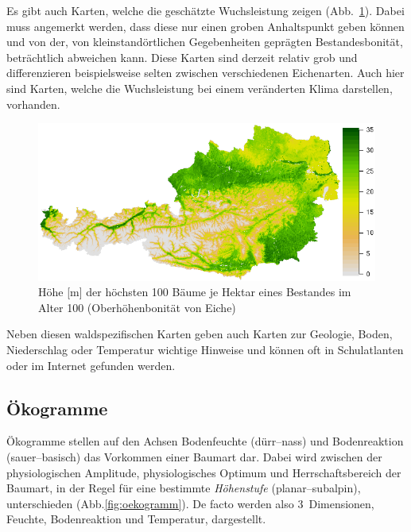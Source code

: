 \documentclass[twocolumn]{scrartcl}
\begin{document}
Es gibt auch Karten, welche die geschätzte Wuchsleistung zeigen
(Abb.~\ref{fig:Eichenbonitaet}). Dabei muss angemerkt werden, dass diese nur
einen groben Anhaltspunkt geben können und von der, von kleinstandörtlichen
Gegebenheiten geprägten Bestandesbonität, beträchtlich abweichen kann. Diese
Karten sind derzeit relativ grob und differenzieren beispielsweise selten
zwischen verschiedenen Eichenarten. Auch hier sind Karten, welche die
Wuchsleistung bei einem veränderten Klima darstellen, vorhanden.

\begin{figure}[htbp]
  \centering
  \includegraphics[width=.95\columnwidth]{./pic/quSp_t0_p1.png}
  \caption{Höhe [m] der höchsten 100 Bäume je Hektar eines Bestandes im
    Alter 100 (Oberhöhenbonität von Eiche)
    \citep[S.~17]{kindermann2021Eiche}}
  \label{fig:Eichenbonitaet}
\end{figure}

Neben diesen waldspezifischen Karten geben auch Karten zur Geologie,
Boden, Niederschlag oder Temperatur wichtige Hinweise und können oft
in Schulatlanten oder im Internet gefunden werden.

\subsection{Ökogramme}
\label{sec:oekogramme}

Ökogramme stellen auf den Achsen Bodenfeuchte (dürr--nass) und
Bodenreaktion (sauer--basisch) das Vorkommen einer Baumart dar. Dabei
wird zwischen der physiologischen Amplitude, physiologisches Optimum
und Herrschaftsbereich der Baumart, in der Regel für eine bestimmte
\emph{Höhenstufe} (planar--subalpin), unterschieden
(Abb.\ref{fig:oekogramm}). De facto werden also 3~Dimensionen,
Feuchte, Bodenreaktion und Temperatur, dargestellt.
\end{document}
